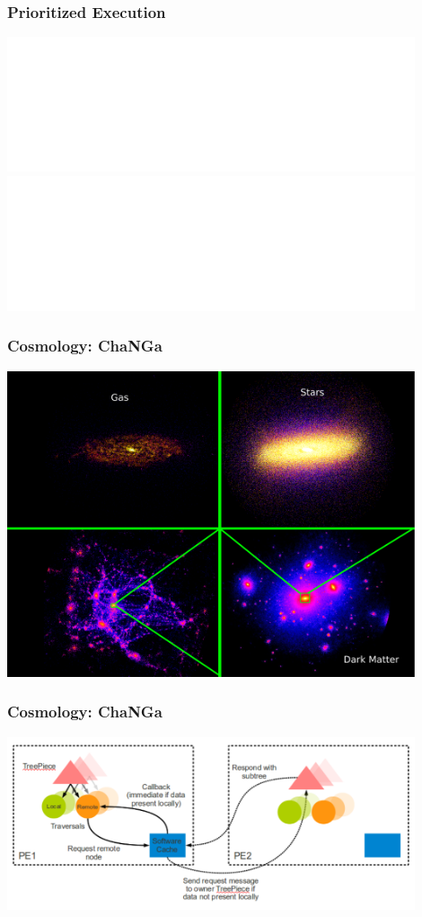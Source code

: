 \begin{frame}
\frametitle{Prioritized Execution}
	\begin{center}
        \includegraphics<1>[width=0.9\textwidth]{../figures/progmodel/16-scheduler.pdf}
        \includegraphics<2>[width=0.9\textwidth]{../figures/progmodel/17-app-scheduler.pdf}
	\end{center}
\end{frame}



\begin{frame}
\frametitle{Cosmology: ChaNGa}
\begin{center}
\includegraphics[width=0.9\textwidth]{../figures/changa-length-scales.pdf}
\end{center}
\end{frame}


\begin{frame}
\frametitle{Cosmology: ChaNGa}
\begin{center}
\includegraphics[width=0.9\textwidth]{../figures/changa.pdf}
\end{center}
\end{frame}


